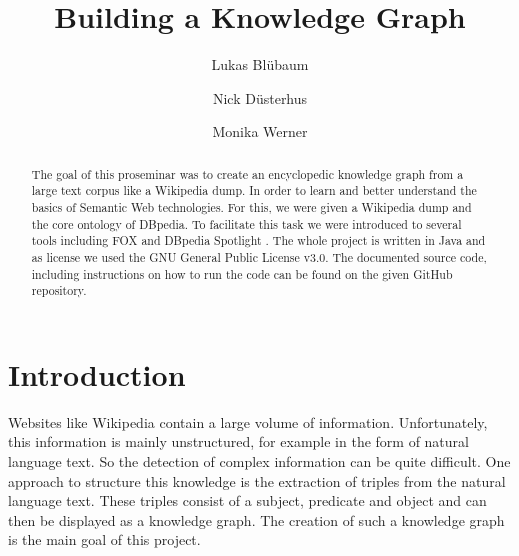 \documentclass[runningheads]{llncs}
\begin{document}
%
\title{Building a Knowledge Graph}
%
%
\renewcommand*\labelitemi{\textbullet}
\author{Lukas Bl{\"u}baum \and Nick D{\"u}sterhus \and Monika Werner}
%
%
%
\maketitle              %
%
\begin{abstract}
The goal of this proseminar was to create an encyclopedic knowledge graph from a large text corpus like a Wikipedia dump. In order to learn and better understand the basics of Semantic Web technologies. For this, we were given a Wikipedia dump and the core ontology of DBpedia. To facilitate this task we were introduced to several tools including FOX \cite{fox} and DBpedia Spotlight \cite{spotlight}. The whole project is written in Java and as license we used the GNU General Public License v3.0. The documented source code, including instructions on how to run the code can be found on the given GitHub repository.

\end{abstract}


\section{Introduction}
Websites like Wikipedia contain a large volume of information. Unfortunately, this information is mainly unstructured, for example in the form of natural language text. So the detection of complex information can be quite difficult. One approach to structure this knowledge is the extraction of triples from the natural language text. These triples consist of a subject, predicate and object and can then be displayed as a knowledge graph. The creation of such a knowledge graph is the main goal of this project. \\
\end{document}
